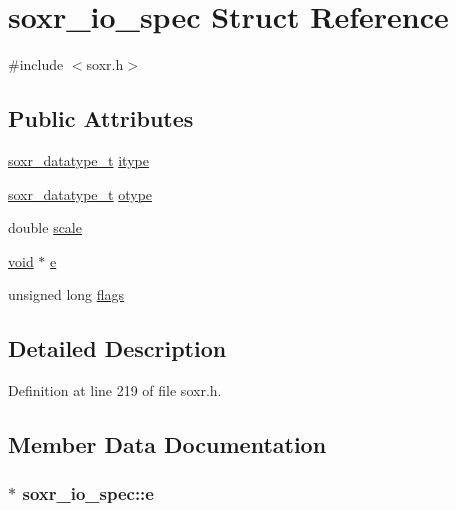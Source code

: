 \hypertarget{structsoxr__io__spec}{}\section{soxr\+\_\+io\+\_\+spec Struct Reference}
\label{structsoxr__io__spec}


{\ttfamily \#include $<$soxr.\+h$>$}

\subsection*{Public Attributes}
\begin{DoxyCompactItemize}
\item 
\hyperlink{soxr_8h_ac648d3d2dd7b1988e631d6205e73f66d}{soxr\+\_\+datatype\+\_\+t} \hyperlink{structsoxr__io__spec_a9d98ffac1d4103593adeff47fd84eded}{itype}
\item 
\hyperlink{soxr_8h_ac648d3d2dd7b1988e631d6205e73f66d}{soxr\+\_\+datatype\+\_\+t} \hyperlink{structsoxr__io__spec_ac8e5ca279ab7ab0a86ee63a1dcd2a2f7}{otype}
\item 
double \hyperlink{structsoxr__io__spec_a7e7adcf5254eace48979ba959babb5db}{scale}
\item 
\hyperlink{sound_8c_ae35f5844602719cf66324f4de2a658b3}{void} $\ast$ \hyperlink{structsoxr__io__spec_af5a0e17c589dde9ac16c77b8ce68ea98}{e}
\item 
unsigned long \hyperlink{structsoxr__io__spec_a69aa73bb10ef8eb5d5da797d96c8268a}{flags}
\end{DoxyCompactItemize}


\subsection{Detailed Description}


Definition at line 219 of file soxr.\+h.



\subsection{Member Data Documentation}
\subsubsection[{\texorpdfstring{e}{e}}]{$\ast$ soxr\+\_\+io\+\_\+spec\+::e}\hypertarget{structsoxr__io__spec_af5a0e17c589dde9ac16c77b8ce68ea98}{}\label{structsoxr__io__spec_af5a0e17c589dde9ac16c77b8ce68ea98}


